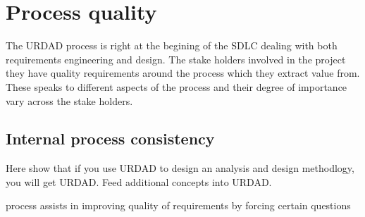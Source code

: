 \section{Process quality}

The URDAD process is right at the begining of the SDLC dealing with both requirements engineering and design. The stake holders
involved in the project they have quality requirements around the process which they extract value from. These speaks to different
aspects of the process and their degree of importance vary across the stake holders.


\subsection{Internal process consistency}

Here show that if you use URDAD to design an analysis and design methodlogy, you will get URDAD. Feed additional concepts into URDAD.

process assists in improving quality of requirements by forcing certain questions
